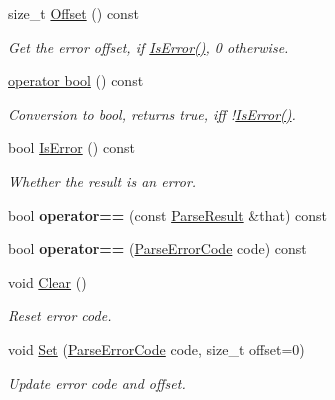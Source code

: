 \begin{DoxyCompactItemize}
size\+\_\+t \hyperlink{struct_parse_result_afbe762766ac21b2aae266105f1dfa643}{Offset} () const
\begin{DoxyCompactList}\small\item\em Get the error offset, if \hyperlink{struct_parse_result_adfe0ef5b994e82f8aa9ebf0b30c924b1}{Is\+Error()}, 0 otherwise. \end{DoxyCompactList}\item 
\mbox{\label{struct_parse_result_a4cec9590497f982dec42e9f0763d5d73}} 
\hyperlink{struct_parse_result_a4cec9590497f982dec42e9f0763d5d73}{operator bool} () const
\begin{DoxyCompactList}\small\item\em Conversion to {\ttfamily bool}, returns {\ttfamily true}, iff !\hyperlink{struct_parse_result_adfe0ef5b994e82f8aa9ebf0b30c924b1}{Is\+Error()}. \end{DoxyCompactList}\item 
\mbox{\label{struct_parse_result_adfe0ef5b994e82f8aa9ebf0b30c924b1}} 
bool \hyperlink{struct_parse_result_adfe0ef5b994e82f8aa9ebf0b30c924b1}{Is\+Error} () const
\begin{DoxyCompactList}\small\item\em Whether the result is an error. \end{DoxyCompactList}\item 
\mbox{\label{struct_parse_result_a4d98465a5dc6055e367a7ea7089fc73d}} 
bool {\bfseries operator==} (const \hyperlink{struct_parse_result}{Parse\+Result} \&that) const
\item 
\mbox{\label{struct_parse_result_a6de18a7e43013b2defc51d892c2cf90f}} 
bool {\bfseries operator==} (\hyperlink{group___r_a_p_i_d_j_s_o_n___e_r_r_o_r_s_ga8d4b32dfc45840bca189ade2bbcb6ba7}{Parse\+Error\+Code} code) const
\item 
\mbox{\label{struct_parse_result_a88b6d44f052a19e6436ae6aadc2c40b4}} 
void \hyperlink{struct_parse_result_a88b6d44f052a19e6436ae6aadc2c40b4}{Clear} ()
\begin{DoxyCompactList}\small\item\em Reset error code. \end{DoxyCompactList}\item 
\mbox{\label{struct_parse_result_aa81b4a7b776b77216cb752385203a8c1}} 
void \hyperlink{struct_parse_result_aa81b4a7b776b77216cb752385203a8c1}{Set} (\hyperlink{group___r_a_p_i_d_j_s_o_n___e_r_r_o_r_s_ga8d4b32dfc45840bca189ade2bbcb6ba7}{Parse\+Error\+Code} code, size\+\_\+t offset=0)
\begin{DoxyCompactList}\small\item\em Update error code and offset. \end{DoxyCompactList}\end{DoxyCompactItemize}
